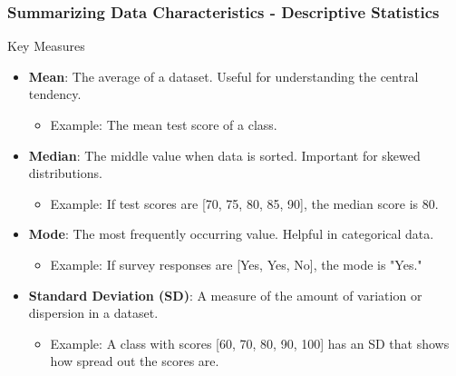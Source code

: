 \documentclass[aspectratio=169]{beamer}
\begin{document}
\begin{frame}[fragile]
    \frametitle{Summarizing Data Characteristics - Descriptive Statistics}
    \begin{block}{Key Measures}
        \begin{itemize}
            \item \textbf{Mean}: The average of a dataset. Useful for understanding the central tendency.
                \begin{itemize}
                    \item Example: The mean test score of a class.
                \end{itemize}
            \item \textbf{Median}: The middle value when data is sorted. Important for skewed distributions.
                \begin{itemize}
                    \item Example: If test scores are [70, 75, 80, 85, 90], the median score is 80.
                \end{itemize}
            \item \textbf{Mode}: The most frequently occurring value. Helpful in categorical data.
                \begin{itemize}
                    \item Example: If survey responses are [Yes, Yes, No], the mode is "Yes."
                \end{itemize}
            \item \textbf{Standard Deviation (SD)}: A measure of the amount of variation or dispersion in a dataset.
                \begin{itemize}
                    \item Example: A class with scores [60, 70, 80, 90, 100] has an SD that shows how spread out the scores are.
                \end{itemize}
        \end{itemize}
    \end{block}
\end{frame}
\end{document}
